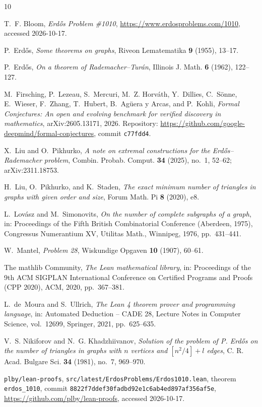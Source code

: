 \documentclass[11pt]{amsart}
\theoremstyle{plain}
\theoremstyle{definition}
\begin{document}
\begin{thebibliography}{10}

T.~F. Bloom, \emph{Erdős Problem \#1010},
\url{https://www.erdosproblems.com/1010}, accessed 2026-10-17.

P.~Erdős, \emph{Some theorems on graphs}, Riveon Lematematika \textbf{9} (1955), 13--17.

P.~Erdős, \emph{On a theorem of {R}ademacher--{T}urán}, Illinois J. Math. \textbf{6} (1962),
122--127.

M.~Firsching, P.~Lezeau, S.~Mercuri, M.~Z. Horváth, Y.~Dillies, C.~Sönne, E.~Wieser, F.~Zhang,
T.~Hubert, B.~Agüera y Arcas, and P.~Kohli, \emph{Formal Conjectures: An open and evolving
benchmark for verified discovery in mathematics}, arXiv:2605.13171, 2026. Repository:
\url{https://github.com/google-deepmind/formal-conjectures}, commit \texttt{c77fdd4}.

X.~Liu and O.~Pikhurko, \emph{A note on extremal constructions for the
{E}rdős--{R}ademacher problem}, Combin. Probab. Comput. \textbf{34} (2025), no.~1, 52--62;
arXiv:2311.18753.

H.~Liu, O.~Pikhurko, and K.~Staden, \emph{The exact minimum number of triangles in graphs with
given order and size}, Forum Math. Pi \textbf{8} (2020), e8.

L.~Lovász and M.~Simonovits, \emph{On the number of complete subgraphs of a graph}, in:
Proceedings of the Fifth British Combinatorial Conference (Aberdeen, 1975), Congressus
Numerantium XV, Utilitas Math., Winnipeg, 1976, pp.~431--441.

W.~Mantel, \emph{Problem 28}, Wiskundige Opgaven \textbf{10} (1907), 60--61.

The mathlib Community, \emph{The {L}ean mathematical library}, in: Proceedings of the 9th ACM
SIGPLAN International Conference on Certified Programs and Proofs (CPP 2020), ACM, 2020,
pp.~367--381.

L.~de~Moura and S.~Ullrich, \emph{The {L}ean 4 theorem prover and programming language}, in:
Automated Deduction -- CADE 28, Lecture Notes in Computer Science, vol.~12699, Springer, 2021,
pp.~625--635.

V.~S. Nikiforov and N.~G. Khadzhiivanov, \emph{Solution of the problem of {P}. {E}rdős on the
number of triangles in graphs with $n$ vertices and $[n^2/4]+l$ edges}, C. R. Acad. Bulgare Sci.
\textbf{34} (1981), no.~7, 969--970.

\texttt{plby/lean-proofs}, \nolinkurl{src/latest/ErdosProblems/Erdos1010.lean}, theorem
\texttt{erdos\_1010}, commit \texttt{8822f7ddef30fadbd92e1c6ab4ed897af356af5e},
\url{https://github.com/plby/lean-proofs}, accessed 2026-10-17.

\end{thebibliography}
\end{document}
